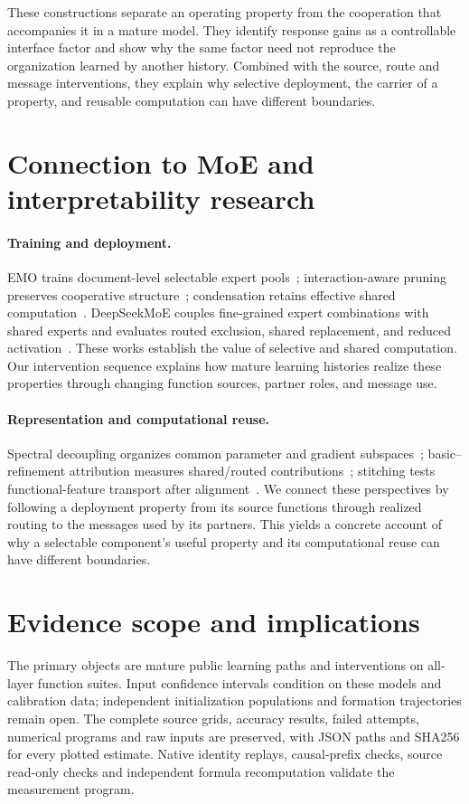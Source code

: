 \documentclass[10pt,twocolumn]{article}
\begin{document}
These constructions separate an operating property from the cooperation that accompanies it in a mature model.
They identify response gains as a controllable interface factor and show why the same factor need not reproduce the organization learned by another history.
Combined with the source, route and message interventions, they explain why selective deployment, the carrier of a property, and reusable computation can have different boundaries.

\section{Connection to MoE and interpretability research}
\paragraph{Training and deployment.}
EMO trains document-level selectable expert pools~\cite{emo}; interaction-aware pruning preserves cooperative structure~\cite{hope}; condensation retains effective shared computation~\cite{cdmoe}.
DeepSeekMoE couples fine-grained expert combinations with shared experts and evaluates routed exclusion, shared replacement, and reduced activation~\cite{deepseekmoe}.
These works establish the value of selective and shared computation.
Our intervention sequence explains how mature learning histories realize these properties through changing function sources, partner roles, and message use.

\paragraph{Representation and computational reuse.}
Spectral decoupling organizes common parameter and gradient subspaces~\cite{sdmoe}; basic--refinement attribution measures shared/routed contributions~\cite{basic}; stitching tests functional-feature transport after alignment~\cite{stitch,howstitch,invariance}.
We connect these perspectives by following a deployment property from its source functions through realized routing to the messages used by its partners.
This yields a concrete account of why a selectable component's useful property and its computational reuse can have different boundaries.

\section{Evidence scope and implications}
The primary objects are mature public learning paths and interventions on all-layer function suites.
Input confidence intervals condition on these models and calibration data; independent initialization populations and formation trajectories remain open.
The complete source grids, accuracy results, failed attempts, numerical programs and raw inputs are preserved, with JSON paths and SHA256 for every plotted estimate.
Native identity replays, causal-prefix checks, source read-only checks and independent formula recomputation validate the measurement program.
\end{document}
